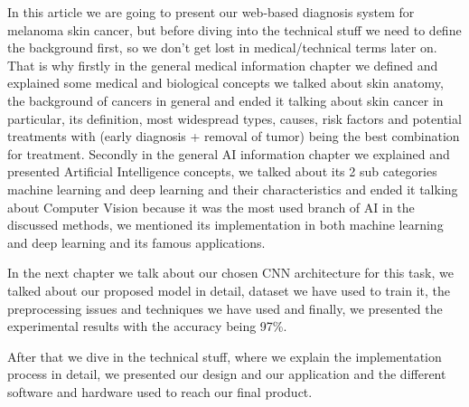 In this article we are going to present our web-based diagnosis system for melanoma skin cancer, but before diving into the technical stuff we need to define the background first, so we don't get lost in medical/technical terms later on. That is why firstly in the general medical information chapter we defined and explained some medical and biological concepts we talked about skin anatomy, the background of cancers in general and ended it talking about skin cancer in particular, its definition, most widespread types, causes, risk factors and potential treatments with (early diagnosis + removal of tumor) being the best combination for treatment. Secondly in the general AI information chapter we explained and presented Artificial Intelligence concepts, we talked about its 2 sub categories machine learning and deep learning and their characteristics and ended it talking about Computer Vision because it was the most used branch of AI in the discussed methods, we mentioned its implementation in both machine learning and deep learning and its famous applications.

In the next chapter we talk about our chosen CNN architecture for this task, we talked about our proposed model in detail, dataset we have used to train it, the preprocessing issues and techniques we have used and finally, we presented the experimental results with the accuracy being 97\%.

After that we dive in the technical stuff, where we explain the implementation process in detail, we presented our design and our application and the different software and hardware used to reach our final product.

